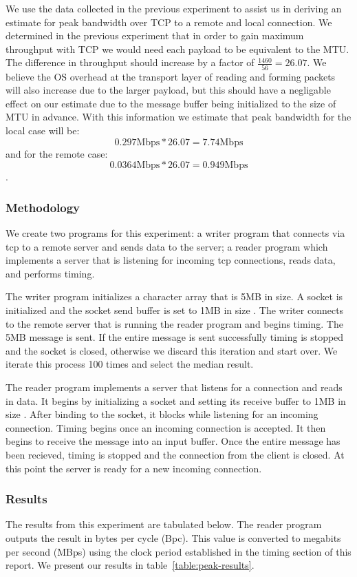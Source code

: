 We use the data collected in the previous experiment to assist us in
deriving an estimate for peak bandwidth over TCP to a remote and local
connection. We determined in the previous experiment that in order to 
gain maximum throughput with TCP we would need each payload to be 
equivalent to the MTU. The difference in throughput should increase 
by a factor of $\frac{1460}{56} = 26.07$. We believe the OS overhead at the transport 
layer of reading and forming packets will also increase due to the larger payload, but 
this should have a negligable effect on our estimate due to the message buffer being 
initialized to the size of MTU in advance. With this information we estimate that 
peak bandwidth for the local case will be: $$0.297\text{Mbps} * 26.07 = 7.74\text{Mbps}$$
and for the remote case: $$0.0364\text{Mbps} * 26.07 = 0.949\text{Mbps}$$.

\subsubsection{Methodology}

We create two programs for this experiment: a writer program that connects via
tcp to a remote server and sends data to the server; a reader program which
implements a server that is listening for incoming tcp connections, reads data,
and performs timing.

The writer program initializes a character array that is 5MB in size. 
A socket is initialized and the socket send buffer is set to 1MB in size \cite{lmbench}. 
The writer connects to the remote server that is running the reader program and begins timing. 
The 5MB message is sent. If the entire message is sent successfully timing is stopped and 
the socket is closed, otherwise we discard this iteration and start over. 
We iterate this process 100 times and select the median result.

The reader program implements a server that listens for a connection and reads in data.
It begins by initializing a socket and setting its receive buffer to 1MB in size \cite{lmbench}.
After binding to the socket, it blocks while listening for an incoming connection. Timing begins
once an incoming connection is accepted. It then begins to receive the message into an input buffer.
Once the entire message has been recieved, timing is stopped and the connection from the client is
closed. At this point the server is ready for a new incoming connection.

\subsubsection{Results}
The results from this experiment are tabulated below. The reader program outputs the result in bytes per cycle (Bpc). This value is converted to megabits per second (MBps) using the clock period established in the timing section of this report. We present our results in table~\ref{table:peak-results}.

